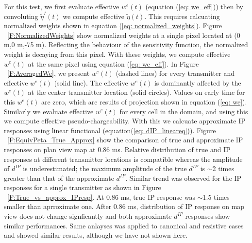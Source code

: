 \documentclass[extra,mreferee]{gji}
\newcommand{\peta}{\tilde{\eta}}
\newcommand{\dip}{d^{IP}}
\begin{document}
For this test, we first evaluate effective $w^e(t)$ (equation (\ref{eq: we_eff})) then by convoluting $\peta^I(t)$ we compute effective $\peta(t)$. 
This requires calcuating normalized weights shown in equation (\ref{eq: normalized_weights}). 
Figure ~\ref{F:NormalizedWeights} show normalized weights at a single pixel located at (0 m,0 m,-75 m). Reflecting the behaviour of the sensitivity function, the normalized weight is decaying from this pixel. 
With these weights, we compute effective $w^e(t)$ at the same pixel using equation (\ref{eq: we_eff}). 
In Figure ~\ref{F:AveragedWe}, we present $w^e(t)$ (dashed lines) for every transmitter and effective $w^e(t)$ (solid line).
The effective $w^e(t)$ is dominantly affected by the $w^e(t)$ at the center transmitter location (solid circles). Values on early time for this $w^e(t)$ are zero, which are results of projection shown in equation (\ref{eq: we}).
Similarly we evaluate effective $w^e(t)$ for every cell in the domain, and using this we compute effective pseudo-chargeability.
With this we calcuate approximate IP responses using linear functional (equation(\ref{eq: dIP_lineareq})).
Figure ~\ref{F:EquivPeta_True_Approx} show the comparison of true and approximate IP responses on plan view map at 0.86 ms. Relative distribution of true and IP responses at different transmitter locations is compatible whereas the amplitude of $\dip$ is underestimated; the maximum amplitude of the true $\dip$ is $\sim$2 times greater than that of the approximate $\dip$. 
Similar trend was observed for the IP responses for a single transmitter as shown in Figure ~\ref{F:True_vs_approx_IPresp}. At 0.86 ms, true IP response was $\sim$1.5 times smaller than aprroximate one. 
After 0.86 ms, distribution of IP response on map view does not change signficantly and both approximate $\dip$ responses show similar performances.
Same anlayses was applied to canonical and resistive cases and showed similar results, although we have not shown here. 
\end{document}
